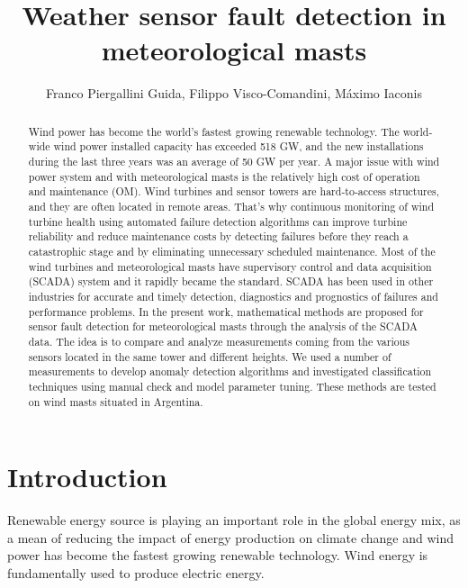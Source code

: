 \documentclass[journal]{IEEEtran}
\begin{document}
\title{Weather sensor fault detection in meteorological masts}

\author{Franco Piergallini Guida, Filippo Visco-Comandini, Máximo Iaconis}
\maketitle

\begin{abstract}
Wind power has become the world's fastest growing renewable technology. The world-wide wind power installed capacity has exceeded 518 GW, and the new installations during the last three years was an average of 50 GW per year. A major issue with wind power system and with meteorological masts is the relatively high cost of operation and maintenance (OM). Wind turbines and sensor towers are hard-to-access structures, and they are often located in remote areas. That's why continuous monitoring of wind turbine health using automated failure detection algorithms can improve turbine reliability and reduce maintenance costs by detecting failures before they reach a catastrophic stage and by eliminating unnecessary scheduled maintenance.
Most of the wind turbines and meteorological masts have supervisory control and data acquisition (SCADA) system and it rapidly became the standard. SCADA has been used in other industries for accurate and timely detection, diagnostics and prognostics of failures and performance problems.
In the present work, mathematical methods are proposed for sensor fault detection for meteorological masts through the analysis of the SCADA data. The idea is to compare and analyze measurements coming from the various sensors located in the same tower and different heights. We used a number of measurements to develop anomaly detection algorithms and investigated classification techniques using manual check and model parameter tuning. 
These methods are tested on wind masts situated in Argentina.
\end{abstract}
\section{Introduction}
Renewable energy source is playing an important role in the global energy mix, as a mean of reducing the impact of energy production on climate change and wind power has become the fastest growing renewable technology. 
Wind energy is fundamentally used to produce electric energy.
\end{document}
